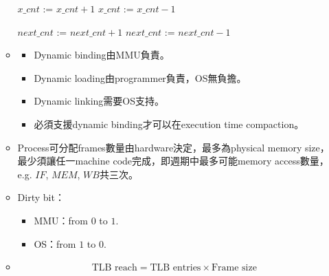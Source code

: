 \begin{itemize}
\begin{itemize}
\begin{algorithm}[H]
\begin{algorithmic}[1]
                    \State $x\_cnt$ := $x\_cnt + 1$
                        \State {}
                    \Else
                        \State {}
                    \EndIf
                    \State {} 
                    \State $x\_cnt$ := $x\_cnt - 1$ 
                \EndFunction
            \end{algorithmic}
        \end{algorithm}
        \begin{algorithm}[H]
            \caption{$x.signal$.}
            \begin{algorithmic}[1]
                        \State $next\_cnt$ := $next\_cnt + 1$
                        \State {}
                        \State {} 
                        \State $next\_cnt$ := $next\_cnt - 1$ 
                    \EndIf
                \EndFunction
            \end{algorithmic}
        \end{algorithm}
    \item \quad\quad \begin{itemize}
        \item Dynamic binding由MMU負責。
        \item Dynamic loading由programmer負責，OS無負擔。
        \item Dynamic linking需要OS支持。
        \item 必須支援dynamic binding才可以在execution time compaction。
    \end{itemize}
    \item Process可分配frames數量由hardware決定，最多為physical memory size，最少須讓任一machine code完成，即週期中最多可能memory access數量，e.g. $IF$, $MEM$, $WB$共三次。
    \item Dirty bit：\begin{itemize}
        \item MMU：from $0$ to $1$.
        \item OS：from $1$ to $0$.
    \end{itemize}
    \item \quad\quad \begin{equation}
        \text{TLB reach} = \text{TLB entries} \times \text{Frame size}
    \end{equation}

\end{itemize}
\end{itemize}
